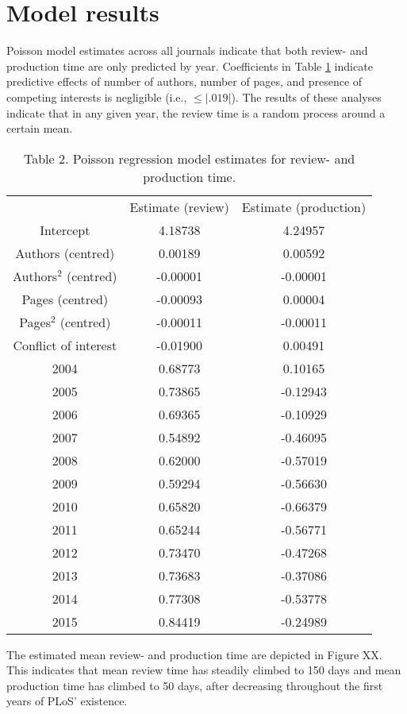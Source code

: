 \section*{Model results}
Poisson model estimates across all journals indicate that both review- and production time are only predicted by year. Coefficients in Table \ref{tab:tab2} indicate predictive effects of number of authors, number of pages, and presence of competing interests is negligible (i.e., $\leq |.019|$). The results of these analyses indicate that in any given year, the review time is a random process around a certain mean.

\begin{table}
\caption{Table 2. Poisson regression model estimates for review- and production time.}
\label{tab:tab2}
\begin{tabular}{ c c c }
    & Estimate (review) & Estimate (production) \\
    Intercept & 4.18738 & 4.24957 \\
    Authors (centred) & 0.00189 & 0.00592 \\
    Authors$^2$ (centred) & -0.00001 & -0.00001 \\
    Pages (centred) & -0.00093 & 0.00004 \\
    Pages$^2$ (centred) & -0.00011 & -0.00011 \\
    Conflict of interest & -0.01900 & 0.00491 \\
    2004  & 0.68773 & 0.10165 \\
    2005  & 0.73865 & -0.12943 \\
    2006  & 0.69365 & -0.10929 \\
    2007  & 0.54892 & -0.46095 \\
    2008  & 0.62000 & -0.57019 \\
    2009  & 0.59294 & -0.56630 \\
    2010  & 0.65820 & -0.66379 \\
    2011  & 0.65244 & -0.56771 \\
    2012  & 0.73470 & -0.47268 \\
    2013  & 0.73683 & -0.37086 \\
    2014  & 0.77308 & -0.53778 \\
    2015  & 0.84419 & -0.24989 \\
\end{tabular}
\end{table}

The estimated mean review- and production time are depicted in Figure XX. This indicates that mean review time has steadily climbed to 150 days and mean production time has climbed to 50 days, after decreasing throughout the first years of PLoS' existence.

